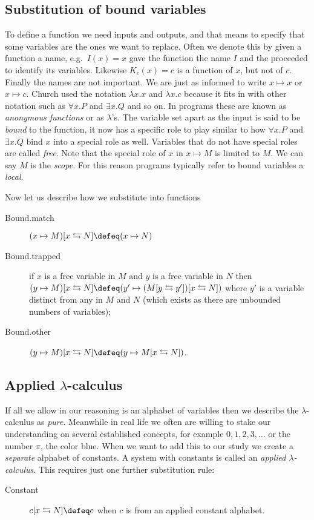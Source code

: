 \subsection{Substitution of bound variables}
To define a function we need inputs and outputs, and that means to specify that
some variables are the ones we want to replace.  Often we denote this by given a
function a name, e.g.\ $I(x)=x$ gave the function the name $I$ and the proceeded
to identify its variables. Likewise $K_c(x)=c$ is a function of $x$, but not of
$c$.  Finally the names are not important.  We are just as informed to write
$x\mapsto x$ or $x\mapsto c$.  Church used the notation $\lambda x.x$ and
$\lambda x.c$ because it fits in with other notation such as $\forall x.P$ and
$\exists x.Q$ and so on.  In programs these are known as \emph{anonymous
functions} or as $\lambda$'s.   The variable set apart as the input is said to
be \emph{bound} to the function, it now has a specific role to play similar to
how $\forall x.P$  and $\exists x.Q$ bind $x$ into a special role as well.
Variables that do not have special roles are called \emph{free}.  Note that the
special role of $x$ in $x\mapsto M$ is limited to $M$.  We can say $M$ is the
\emph{scope}.  For this reason programs typically refer to bound variables a
\emph{local}.

Now let us describe how we substitute into functions
\begin{description}
    \item[Bound.match] $(x\mapsto M)[x\leftrightarrows N]\defeq (x\mapsto N)$
    \item[Bound.trapped]
    if $x$ is a free variable in $M$ and $y$ is a free variable in $N$ then 
    $(y\mapsto M)[x\leftrightarrows N]\defeq (y'\mapsto (M[y\leftrightarrows y'])[x\leftrightarrows N])$ where 
    $y'$ is a variable distinct from any in $M$ and $N$ (which exists 
    as there are unbounded numbers of variables);

    \item[Bound.other] $(y\mapsto M)[x\leftrightarrows N]\defeq (y\mapsto M[x\leftrightarrows N])$.
\end{description}

\subsection{Applied $\lambda$-calculus}
If all we allow in our reasoning is an alphabet of variables then we describe
the $\lambda$-calculus as \emph{pure}.  Meanwhile in real life we often are
willing to stake our understanding on several established concepts, for example
$0,1,2,3,\ldots$ or the number $\pi$, the color blue.  When we want to add this
to our study we create a \emph{separate} alphabet of constants.  A system with
constants is called an \emph{applied $\lambda$-calculus}.  This requires just one 
further substitution rule:
\begin{description}
    \item[Constant] $c[x\leftrightarrows N]\defeq c$ when $c$ is from an applied constant alphabet. 
\end{description}

